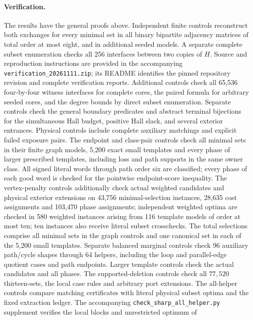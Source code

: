 \documentclass[11pt]{article}
\begin{document}
\paragraph{Verification.}
The results have the general proofs above. Independent finite controls
reconstruct both exchanges for every minimal set in all binary bipartite
adjacency matrices of total order at most eight, and in additional seeded
models. A separate complete subset enumeration checks all 256 interfaces
between two copies of $H$. Source and reproduction instructions are provided in the accompanying
\texttt{verification\_20261111.zip}; its README identifies the pinned
repository revision and complete verification reports. Additional controls check all 65,536 four-by-four witness interfaces
for complete cores, the paired formula for arbitrary seeded cores, and
the degree bounds by direct subset enumeration. Separate controls
check the general boundary predicates and abstract terminal bijections
for the simultaneous Hall budget, positive Hall slack, and several exterior entrances. Physical controls include complete auxiliary matchings and explicit failed exposure pairs. The endpoint and class-pair controls check all minimal sets in their finite graph
models, 5,200 exact small templates and every phase of larger prescribed
templates, including loss and path supports in the same owner class. All signed literal words through path order six are classified; every phase
of each good word is checked for the pointwise endpoint-score inequality.
The vertex-penalty controls additionally check actual weighted candidates and
physical exterior extensions on 43,756 minimal-selection instances, 28,635
cost assignments and 103,470 phase assignments; independent weighted optima
are checked in 580 weighted instances arising from 116 template models of
order at most ten; ten instances also receive literal subset crosschecks. The total selections comprise all minimal sets in the graph controls and
one canonical set in each of the 5,200 small templates. Separate balanced
marginal controls check 96 auxiliary path/cycle shapes through 64 helpers,
including the loop and parallel-edge quotient cases and path endpoints.
Larger template controls check the actual candidates and all phases. The supported-deletion controls check all $77,520$ thirteen-sets, the local
case rules and arbitrary port extensions. The all-helper controls compare
matching certificates with literal physical subset optima and the fixed
extraction ledger. The accompanying \texttt{check\_sharp\_all\_helper.py}
supplement verifies the local blocks and unrestricted optimum of
\end{document}
